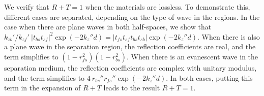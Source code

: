 We verify that $R+T=1$ when the materials are lossless.
To demonstrate this, different cases are separated, depending on the type of wave in the regions.
In the case when there are plane waves in both half-spaces, we show that 
$
k_{zb}'/k_{zf}'\ |t_{bs}t_{sf}|^2 \exp(-2 k_z'' d)
= |t_{fs} t_{sf} t_{bs} t_{sb}| \exp(-2 k_z'' d)
$.
When there is also a plane wave in the separation region, the reflection coefficients are real, and the term simplifies to 
$(1-r_{fs}^2)(1-r_{bs}^2)$.
When there is an evanescent wave in the separation medium, the reflection coefficients are complex with unitary modulus, and the term simplifies to 
$4\ r_{bs}'' r_{fs}'' \exp(-2 k_z'' d)$.
In both cases, putting this term in the expansion of $R+T$ leads to the result
$R+T=1$.

